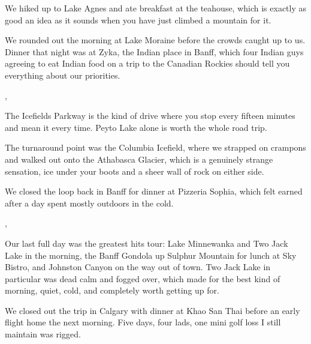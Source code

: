 We hiked up to Lake Agnes and ate breakfast at the teahouse, which is exactly
as good an idea as it sounds when you have just climbed a mountain for it.


We rounded out the morning at Lake Moraine before the crowds caught up to
us. Dinner that night was at Zyka, the Indian place in Banff, which four
Indian guys agreeing to eat Indian food on a trip to the Canadian Rockies
should tell you everything about our priorities.


\sep

The Icefields Parkway is the kind of drive where you stop every fifteen
minutes and mean it every time. Peyto Lake alone is worth the whole road trip.


The turnaround point was the Columbia Icefield, where we strapped on crampons
and walked out onto the Athabasca Glacier, which is a genuinely strange
sensation, ice under your boots and a sheer wall of rock on either side.


We closed the loop back in Banff for dinner at Pizzeria Sophia, which felt
earned after a day spent mostly outdoors in the cold.

\sep

Our last full day was the greatest hits tour: Lake Minnewanka and Two Jack
Lake in the morning, the Banff Gondola up Sulphur Mountain for lunch at Sky
Bistro, and Johnston Canyon on the way out of town. Two Jack Lake in
particular was dead calm and fogged over, which made for the best kind of
morning, quiet, cold, and completely worth getting up for.


We closed out the trip in Calgary with dinner at Khao San Thai before an early
flight home the next morning. Five days, four lads, one mini golf loss I still
maintain was rigged.



